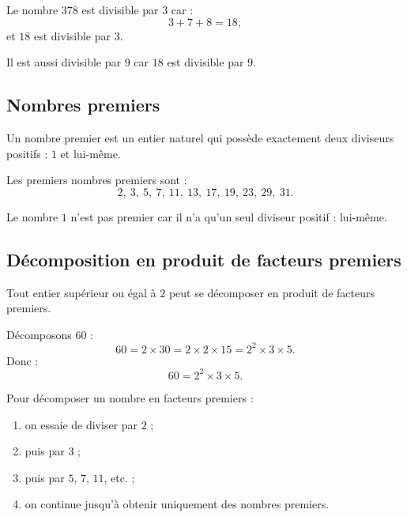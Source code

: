 \documentclass[11pt,a4paper]{article}
\begin{document}
\begin{exemple}
Le nombre $378$ est divisible par $3$ car :
\[
3+7+8=18,
\]
et $18$ est divisible par $3$.

Il est aussi divisible par $9$ car $18$ est divisible par $9$.
\end{exemple}

\subsection{Nombres premiers}

\begin{definitionbox}
Un nombre premier est un entier naturel qui possède exactement deux diviseurs positifs : $1$ et lui-même.
\end{definitionbox}

\begin{exemple}
Les premiers nombres premiers sont :
\[
2,\ 3,\ 5,\ 7,\ 11,\ 13,\ 17,\ 19,\ 23,\ 29,\ 31.
\]
\end{exemple}

\begin{attention}
Le nombre $1$ n'est pas premier car il n'a qu'un seul diviseur positif : lui-même.
\end{attention}

\subsection{Décomposition en produit de facteurs premiers}

\begin{propriete}
Tout entier supérieur ou égal à $2$ peut se décomposer en produit de facteurs premiers.
\end{propriete}

\begin{exemple}
Décomposons $60$ :
\[
60=2\times30=2\times2\times15=2^2\times3\times5.
\]
Donc :
\[
60=2^2\times3\times5.
\]
\end{exemple}

\begin{methode}
Pour décomposer un nombre en facteurs premiers :
\begin{enumerate}
  \item on essaie de diviser par $2$ ;
  \item puis par $3$ ;
  \item puis par $5$, $7$, $11$, etc. ;
  \item on continue jusqu'à obtenir uniquement des nombres premiers.
\end{enumerate}
\end{methode}
\end{document}

